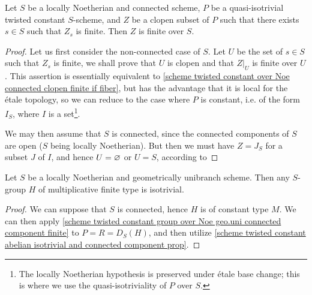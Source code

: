 \begin{lemma}\label{scheme twisted constant over Noe connected clopen finite if fiber}
Let $S$ be a locally Noetherian and connected scheme, $P$ be a quasi-isotrivial twisted constant $S$-scheme, and $Z$ be a clopen subset of $P$ such that there exists $s\in S$ such that $Z_s$ is finite. Then $Z$ is finite over $S$.
\end{lemma}
\begin{proof}
Let us first consider the non-connected case of $S$. Let $U$ be the set of $s\in S$ such that $Z_s$ is finite, we shall prove that $U$ is clopen and that $Z|_U$ is finite over $U$. This assertion is essentially equivalent to \cref{scheme twisted constant over Noe connected clopen finite if fiber}, but has the advantage that it is local for the \'etale topology, so we can reduce to the case where $P$ is constant, i.e. of the form $I_S$, where $I$ is a set\footnote{The locally Noetherian hypothesis is preserved under \'etale base change; this is where we use the quasi-isotriviality of $P$ over $S$.}.\par
We may then assume that $S$ is connected, since the connected components of $S$ are open ($S$ being locally Noetherian). But then we must have $Z=J_S$ for a subset $J$ of $I$, and hence $U=\varnothing$ or $U=S$, according to 
\end{proof}

\begin{corollary}\label{scheme group multiplicative ft over Noe geo.uni is isotrivial}
Let $S$ be a locally Noetherian and geometrically unibranch scheme. Then any $S$-group $H$ of multiplicative finite type is isotrivial.
\end{corollary}
\begin{proof}
We can suppose that $S$ is connected, hence $H$ is of constant type $M$. We can then apply \cref{scheme twisted constant group over Noe geo.uni connected component finite} to $P=R=D_S(H)$, and then utilize \cref{scheme twisted constant abelian isotrivial and connected component prop}.
\end{proof}


